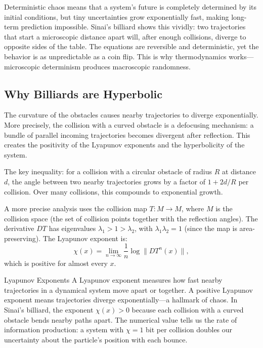 \begin{bigidea}
Deterministic chaos means that a system's future is completely determined by its initial conditions, but tiny uncertainties grow exponentially fast, making long-term prediction impossible. Sinai's billiard shows this vividly: two trajectories that start a microscopic distance apart will, after enough collisions, diverge to opposite sides of the table. The equations are reversible and deterministic, yet the behavior is as unpredictable as a coin flip. This is why thermodynamics works---microscopic determinism produces macroscopic randomness.
\end{bigidea}

\subsection{Why Billiards are Hyperbolic}

The curvature of the obstacles causes nearby trajectories to diverge exponentially. More precisely, the collision with a curved obstacle is a defocusing mechanism: a bundle of parallel incoming trajectories becomes divergent after reflection. This creates the positivity of the Lyapunov exponents and the hyperbolicity of the system.

The key inequality: for a collision with a circular obstacle of radius $R$ at distance $d$, the angle between two nearby trajectories grows by a factor of $1 + 2d/R$ per collision. Over many collisions, this compounds to exponential growth.

A more precise analysis uses the collision map $T: M \to M$, where $M$ is the collision space (the set of collision points together with the reflection angles). The derivative $DT$ has eigenvalues $\lambda_1 > 1 > \lambda_2$, with $\lambda_1 \lambda_2 = 1$ (since the map is area-preserving). The Lyapunov exponent is:
\[
\chi(x) = \lim_{n\to\infty} \frac{1}{n} \log \|DT^n(x)\|,
\]
which is positive for almost every $x$.

\begin{primer}{Lyapunov Exponents}
A Lyapunov exponent measures how fast nearby trajectories in a dynamical system move apart or together. A positive Lyapunov exponent means trajectories diverge exponentially---a hallmark of chaos. In Sinai's billiard, the exponent $\chi(x) > 0$ because each collision with a curved obstacle bends nearby paths apart. The numerical value tells us the rate of information production: a system with $\chi = 1$ bit per collision doubles our uncertainty about the particle's position with each bounce.
\end{primer}

